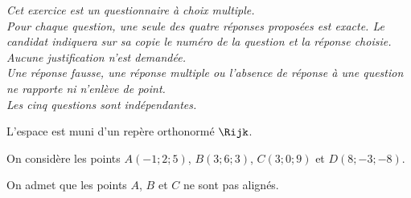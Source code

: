 \emph{Cet exercice est un questionnaire à choix multiple.\\
	Pour chaque question, une seule des quatre réponses proposées est exacte. Le candidat indiquera sur sa copie le numéro de la question et la réponse choisie. Aucune justification n'est demandée.\\
	Une réponse fausse, une réponse multiple ou l'absence de réponse à une question ne rapporte ni n'enlève de point.\\
	Les cinq questions sont indépendantes.}

\medskip

L'espace est muni d'un repère orthonormé $\Rijk$.

\smallskip

On considère les points $A(-1;2;5)$, $B(3;6;3)$, $C(3;0;9)$ et $D(8;-3;-8)$.

On admet que les points $A$, $B$ et $C$ ne sont pas alignés.

